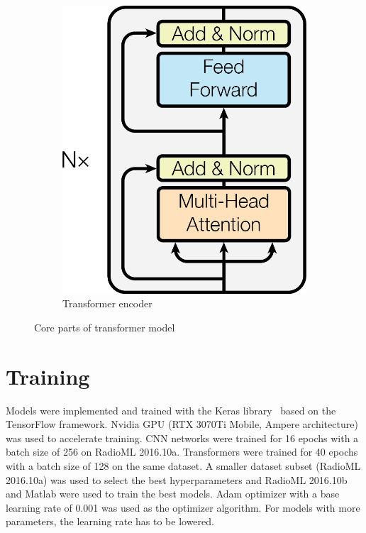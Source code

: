 \begin{figure}
\begin{subfigure}[b]{0.3\textwidth}
         \includegraphics[width=\textwidth]{graphic/encoder.png}
         \caption{Transformer encoder}
         \label{fig:encoder}
     \end{subfigure}
        \caption{Core parts of transformer model~\cite{attention_is_all_you_need}}
        \label{fig:transformer_core}
\end{figure}

\section{Training} \label{training}

Models were implemented and trained with the Keras library~\cite{keras} based on the TensorFlow framework. Nvidia GPU (RTX 3070Ti Mobile, Ampere architecture) was used to accelerate training. CNN networks were trained for 16 epochs with a batch size of 256 on RadioML 2016.10a. Transformers were trained for 40 epochs with a batch size of 128 on the same dataset. A smaller dataset subset (RadioML 2016.10a) was used to select the best hyperparameters and RadioML 2016.10b and Matlab were used to train the best models. Adam optimizer with a base learning rate of 0.001 was used as the optimizer algorithm. For models with more parameters, the learning rate has to be lowered. 

